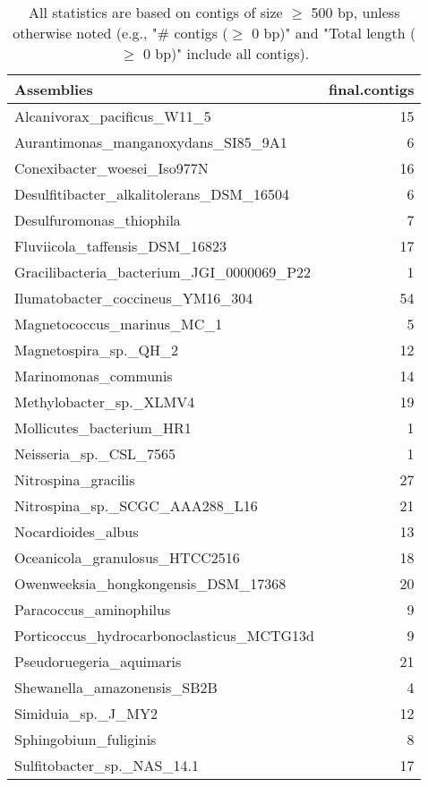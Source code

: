\documentclass[12pt,a4paper]{article}
\begin{document}
\begin{table}[ht]
\begin{center}
\caption{All statistics are based on contigs of size $\geq$ 500 bp, unless otherwise noted (e.g., "\# contigs ($\geq$ 0 bp)" and "Total length ($\geq$ 0 bp)" include all contigs).}
\begin{tabular}{|l*{1}{|r}|}
\hline
Assemblies & final.contigs \\ \hline
Alcanivorax\_pacificus\_W11\_5 & 15 \\ \hline
Aurantimonas\_manganoxydans\_SI85\_9A1 & 6 \\ \hline
Conexibacter\_woesei\_Iso977N & 16 \\ \hline
Desulfitibacter\_alkalitolerans\_DSM\_16504 & 6 \\ \hline
Desulfuromonas\_thiophila & 7 \\ \hline
Fluviicola\_taffensis\_DSM\_16823 & 17 \\ \hline
Gracilibacteria\_bacterium\_JGI\_0000069\_P22 & 1 \\ \hline
Ilumatobacter\_coccineus\_YM16\_304 & 54 \\ \hline
Magnetococcus\_marinus\_MC\_1 & 5 \\ \hline
Magnetospira\_sp.\_QH\_2 & 12 \\ \hline
Marinomonas\_communis & 14 \\ \hline
Methylobacter\_sp.\_XLMV4 & 19 \\ \hline
Mollicutes\_bacterium\_HR1 & 1 \\ \hline
Neisseria\_sp.\_CSL\_7565 & 1 \\ \hline
Nitrospina\_gracilis & 27 \\ \hline
Nitrospina\_sp.\_SCGC\_AAA288\_L16 & 21 \\ \hline
Nocardioides\_albus & 13 \\ \hline
Oceanicola\_granulosus\_HTCC2516 & 18 \\ \hline
Owenweeksia\_hongkongensis\_DSM\_17368 & 20 \\ \hline
Paracoccus\_aminophilus & 9 \\ \hline
Porticoccus\_hydrocarbonoclasticus\_MCTG13d & 9 \\ \hline
Pseudoruegeria\_aquimaris & 21 \\ \hline
Shewanella\_amazonensis\_SB2B & 4 \\ \hline
Simiduia\_sp.\_J\_MY2 & 12 \\ \hline
Sphingobium\_fuliginis & 8 \\ \hline
Sulfitobacter\_sp.\_NAS\_14.1 & 17 \\ \hline

\end{tabular}
\end{center}
\end{table}
\end{document}
